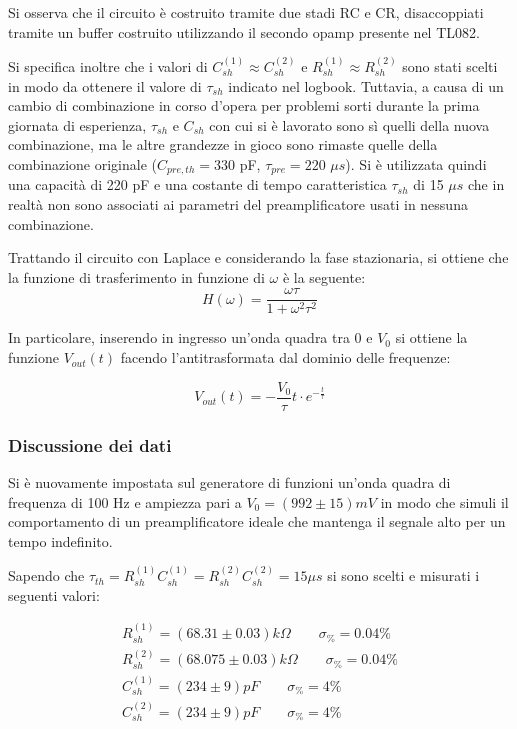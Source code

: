 \documentclass{article}
\begin{document}
Si osserva che il circuito è costruito tramite due stadi RC e CR, disaccoppiati tramite un buffer costruito utilizzando il secondo 
opamp presente nel TL082.

Si specifica inoltre che i valori di $C_{sh}^{(1)}\approx C_{sh}^{(2)}$ e $R_{sh}^{(1)}\approx R_{sh}^{(2)}$ sono stati scelti in modo da ottenere 
il valore di $\tau_{sh}$ indicato nel logbook. Tuttavia, a causa di un cambio di combinazione in corso d'opera per problemi sorti durante la 
prima giornata di esperienza, $\tau_{sh}$ e $C_{sh}$ con cui si è lavorato sono sì quelli della nuova combinazione, ma le altre grandezze in gioco sono rimaste quelle
della combinazione originale ($C_{pre,th}=330$ pF, $\tau_{pre}=220$ $\mu s$). Si è utilizzata quindi una capacità di 220 pF
e una costante di tempo caratteristica $\tau_{sh}$ di 15 $\mu s$ che in realtà non sono associati ai parametri del preamplificatore usati in nessuna combinazione.

Trattando il circuito con Laplace e considerando la fase stazionaria, si ottiene che la funzione di trasferimento in funzione di 
$\omega$ è la seguente:
\begin{equation}
H(\omega)=\frac{\omega \tau}{1+\omega^2\tau^2}
\end{equation}

In particolare, inserendo in ingresso un'onda quadra tra 0 e $V_0$ si ottiene la funzione $V_{out}(t)$ facendo l'antitrasformata 
dal dominio delle frequenze:

\begin{equation}
    \label{eqn:V_sh}
    V_{out}(t)= - \frac{V_0}{\tau} t \cdot e^{-\frac{t}{\tau}}
\end{equation}
    

\subsubsection{Discussione dei dati}
Si è nuovamente impostata sul generatore di funzioni un'onda quadra di frequenza di 100 Hz e ampiezza pari a $V_{0}=(992 \pm 15)mV$
in modo che simuli il comportamento di un preamplificatore ideale che mantenga il segnale alto per un tempo indefinito.

Sapendo che $\tau_{th}=R_{sh}^{(1)} C_{sh}^{(1)} = R_{sh}^{(2)} C_{sh}^{(2)}=15 \mu s$ si sono scelti e misurati i seguenti valori:

\begin{align*}
R_{sh}^{(1)} = (68.31  \pm 0.03)k\Omega \quad\quad \sigma_{\%}=  0.04 \% \\
R_{sh}^{(2)} = (68.075  \pm 0.03)k\Omega \quad\quad \sigma_{\%}=  0.04\% \\
C_{sh}^{(1)}= (234 \pm  9)pF \quad\quad \sigma_{\%}= 4 \% \\
C_{sh}^{(2)}= (234 \pm  9)pF \quad\quad \sigma_{\%}= 4 \% \\
\end{align*}
\end{document}
